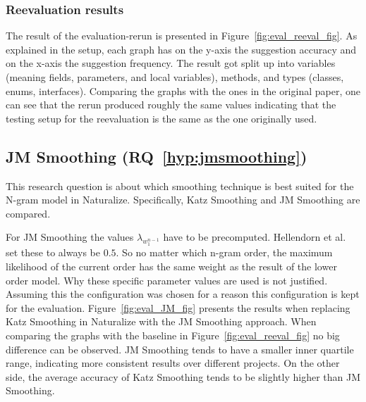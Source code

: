 \subsubsection{Reevaluation results}

The result of the evaluation-rerun is presented in Figure~\ref{fig:eval_reeval_fig}.
As explained in the setup, each graph has on the y-axis the suggestion accuracy and on the x-axis the suggestion frequency. The result got split up into variables (meaning fields, parameters, and local variables), methods, and types (classes, enums, interfaces). Comparing the graphs with the ones in the original paper, one can see that the rerun produced roughly the same values indicating that the testing setup for the reevaluation is the same as the one originally used. 

\subsection{JM Smoothing (RQ~\ref{hyp:jmsmoothing})}

This research question is about which smoothing technique is best suited for the N-gram model in Naturalize. Specifically, Katz Smoothing and JM Smoothing are compared.

For JM Smoothing the values $\lambda_{w_1^{n-1}}$ have to be precomputed. Hellendorn et al.~\cite{nestedngram} set these to always be $0.5$. So no matter which n-gram order, the maximum likelihood of the current order has the same weight as the result of the lower order model. Why these specific parameter values are used is not justified. Assuming this the configuration was chosen for a reason this configuration is kept for the evaluation. Figure~\ref{fig:eval_JM_fig} presents the results when replacing Katz Smoothing in Naturalize with the JM Smoothing approach. When comparing the graphs with the baseline in Figure~\ref{fig:eval_reeval_fig} no big difference can be observed. JM Smoothing tends to have a smaller inner quartile range, indicating more consistent results over different projects. On the other side, the average accuracy of Katz Smoothing tends to be slightly higher than JM Smoothing.

\noindent{}

